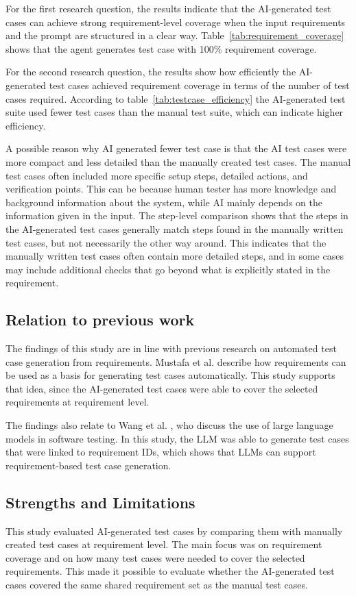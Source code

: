 \documentclass[a4paper,12pt]{article}
\begin{document}
For the first research question, the results indicate that the AI-generated test cases can achieve strong requirement-level coverage when the input requirements and the prompt are structured in a clear way. Table~\ref{tab:requirement_coverage} shows that the agent generates test case with 100\% requirement coverage.

For the second research question, the results show how efficiently the AI-generated test cases achieved requirement coverage in terms of the number of test cases required. According to table~\ref{tab:testcase_efficiency} the AI-generated test suite used fewer test cases than the manual test suite, which can indicate higher efficiency. 

A possible reason why AI generated fewer test case is that the AI test cases were more compact and less detailed than the manually created test cases. The manual test cases often included more specific setup steps, detailed actions, and verification points. This can be because human tester has more knowledge and background information about the system, while AI mainly depends on the information given in the input. The step-level comparison shows that the steps in the AI-generated test cases generally match steps found in the manually written test cases, but not necessarily the other way around. This indicates that the manually written test cases often contain more detailed steps, and in some cases may include additional checks that go beyond what is explicitly stated in the requirement.
\subsection{Relation to previous work}
The findings of this study are in line with previous research on automated test case generation from requirements. Mustafa et al. \cite{mustafa2021automated} describe how requirements can be used as a basis for generating test cases automatically. This study supports that idea, since the AI-generated test cases were able to cover the selected requirements at requirement level.

The findings also relate to Wang et al. \cite{wang2024software}, who discuss the use of large language models in software testing. In this study, the LLM was able to generate test cases that were linked to requirement IDs, which shows that LLMs can support requirement-based test case generation.

\subsection{Strengths and Limitations}
This study evaluated AI-generated test cases by comparing them with manually created test cases at requirement level. The main focus was on requirement coverage and on how many test cases were needed to cover the selected requirements. This made it possible to evaluate whether the AI-generated test cases covered the same shared requirement set as the manual test cases.
\end{document}
